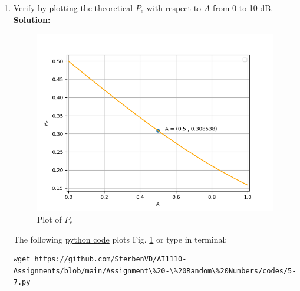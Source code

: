 \documentclass[journal,12pt,twocolumn]{IEEEtran}
\numberwithin{equation}{section}
\renewcommand\thesection{\arabic{section}}
\providecommand{\pr}[1]{\ensuremath{\Pr\left(#1\right)}}
\providecommand{\gauss}[2]{\mathcal{N}\ensuremath{\left(#1,#2\right)}}
\providecommand{\gitlink}[2]{{\color{blue}\href{https://github.com/SterbenVD/AI1110-Assignments/blob/main/Assignment\%20-\%20Random\%20Numbers/#1}{#2}}}
\newcommand{\solution}{\noindent \textbf{\\ Solution: }}
\begin{document}
\begin{enumerate}[label=\thesection.\arabic*
        ,ref=\thesection.\theenumi]
\begin{align}
          \end{align}
          Also,
          \begin{align}
              P_{e|0} & = \pr{\hat{X} = -1|X=1} \\
                      & = \pr{AX + N < 0|X=1}   \\
                      & = \pr{A + N < 0}        \\
                      & = \pr{N < -A}
          \end{align}
          Since, $N \sim \gauss{0}{1}$
          \begin{align}
              \implies P_{e|0} & = \int_{-\infty} ^{-A} \dfrac{1}{\sqrt{2\pi}} e^{\frac{-x^2}{2}} dx \\
                               & = \int_{A} ^{\infty} \dfrac{1}{\sqrt{2\pi}} e^{\frac{-x^2}{2}} dx   \\
                               & = Q_N(A)
          \end{align}
          Similarly, $P_{e|1} = Q_N(A)$
          \begin{align}
              \implies P_e = Q_N(A)
          \end{align}
    \item
          Verify by plotting  the theoretical $P_e$ with respect to $A$ from 0 to 10 dB.
          \solution
          \begin{figure}[H]
              \centering
              \includegraphics[width = \columnwidth]{../figs/5-7}
              \caption{Plot of $P_e$}
              \label{fig:5-7}
          \end{figure}
          The following \gitlink{codes/5-7.py}{python code} plots Fig. \ref{fig:5-7} or type in terminal:
          \begin{lstlisting}
wget https://github.com/SterbenVD/AI1110-Assignments/blob/main/Assignment\%20-\%20Random\%20Numbers/codes/5-7.py
              \end{lstlisting}


\end{enumerate}
\end{document}
